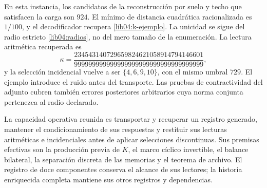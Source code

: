 En esta instancia, los candidatos de la reconstrucción por suelo y
techo que satisfacen la carga son \(924\). El mínimo de distancia
cuadrática racionalizada es \(1/100\), y el decodificador recupera
\eqref{lib04:k-ejemplo}. La unicidad se sigue del radio estricto
\eqref{lib04:radios}, no del mero tamaño de la enumeración.
La lectura aritmética recuperada es
\begin{equation}
 \kappa=
 \frac{234543140729659824621058914794146601}
      {999999999999999999999999999999999999},
 \label{lib04:kappa-ejemplo}
\end{equation}
y la selección incidencial vuelve a ser \(\{4,6,9,10\}\), con
el mismo umbral \(729\). El ejemplo introduce el ruido antes del
transporte. Las pruebas de contractividad del adjunto cubren también
errores posteriores arbitrarios cuya norma conjunta pertenezca al
radio declarado.

La capacidad operativa reunida es transportar y recuperar un registro
generado, mantener el condicionamiento de sus respuestas y restituir
sus lecturas aritméticas e incidenciales antes de aplicar selecciones
discontinuas. Sus premisas efectivas son la producción previa de
\(K\), el marco cíclico invertible, el balance bilateral, la
separación discreta de las memorias y el teorema de archivo. El
registro de doce componentes conserva el alcance de sus lectores;
la historia enriquecida completa mantiene sus otros registros y
dependencias.

